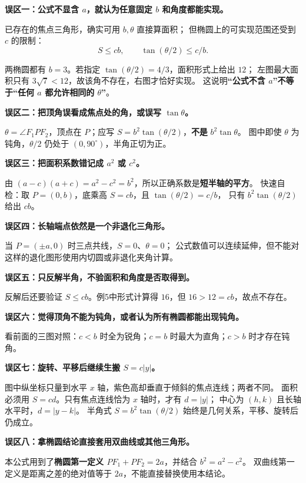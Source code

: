 \begin{trapbox}
\textbf{误区一：公式不显含 $a$，就认为任意固定 $b$ 和角度都能实现。}

已存在的焦点三角形，确实可用 $b,\theta$ 直接算面积；
但椭圆上的可实现范围还受到 $c$ 的限制：
\[
 \boxed{S\le cb,\qquad\tan(\theta/2)\le c/b}.
\]

两椭圆都有 $b=3$。若指定 $\tan(\theta/2)=4/3$，面积形式上给出 $12$；
左图最大面积只有 $3\sqrt7<12$，故该角不存在，右图才恰好实现。
这说明\textbf{“公式不含 $a$”不等于“任何 $a$ 都允许相同的 $\theta$”}。

\medskip
\textbf{误区二：把顶角误看成焦点处的角，或误写 $\tan\theta$。}

$\theta=\angle F_1PF_2$，顶点在 $P$；应写
$S=b^2\tan(\theta/2)$，\textbf{不是} $b^2\tan\theta$。
图中即使 $\theta$ 为钝角，$\theta/2$ 仍处于 $(0,90^\circ)$，半角正切为正。

\medskip
\textbf{误区三：把面积系数错记成 $a^2$ 或 $c^2$。}

由 $(a-c)(a+c)=a^2-c^2=\boxed{b^2}$，所以正确系数是\textbf{短半轴的平方}。
快速自检：取 $P=(0,b)$，底乘高 $S=cb$，且 $\tan(\theta/2)=c/b$，
只有 $b^2\tan(\theta/2)$ 给出 $cb$。

\medskip
\textbf{误区四：长轴端点依然是一个非退化三角形。}

当 $P=(\pm a,0)$ 时三点共线，$S=0$、$\theta=0$；
公式数值可以连续延伸，但不能对这样的退化图形使用内切圆或非退化夹角计算。

\medskip
\textbf{误区五：只反解半角，不验面积和角度是否取得到。}

反解后还要验证 $S\le cb$。例5中形式计算得 $16$，但 $16>12=cb$，故点不存在。

\medskip
\textbf{误区六：觉得顶角不能为钝角，或者认为所有椭圆都能出现钝角。}

看前面的三图对照：$c<b$ 时全为锐角；$c=b$ 时最大为直角；$c>b$ 时才存在钝角。

\end{trapbox}
\clearpage
\begin{trapbox}
\textbf{误区七：旋转、平移后继续生搬 $S=c|y|$。}

图中纵坐标只量到水平 $x$ 轴，紫色高却垂直于倾斜的焦点连线；两者不同。
面积必须用 $S=cd$。只有焦点连线恰为 $x$ 轴时，才有 $d=|y|$；
中心为 $(h,k)$ 且长轴水平时，$d=|y-k|$。
半角式 $S=b^2\tan(\theta/2)$ 始终是几何关系，平移、旋转后仍成立。

\medskip
\textbf{误区八：拿椭圆结论直接套用双曲线或其他三角形。}

本公式用到了\textbf{椭圆第一定义 $PF_1+PF_2=2a$}，并结合 $b^2=a^2-c^2$。
双曲线第一定义是距离之差的绝对值等于 $2a$，不能直接替换使用本结论。
\end{trapbox}
\clearpage
